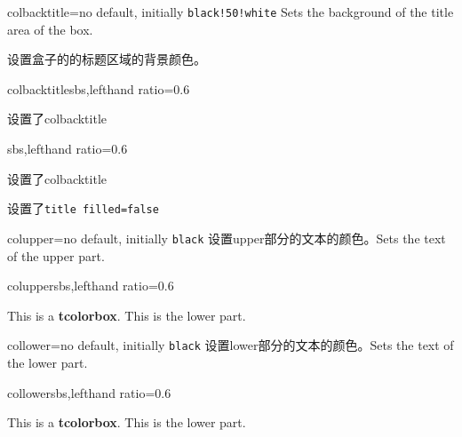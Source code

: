 \begin{docTcbKey}{colbacktitle}{=}{no default, initially \texttt{black!50!white}}
Sets the background  of the title area of the box.

设置盒子的的标题区域的背景颜色。
\begin{exdispExample*}{colbacktitle}{sbs,lefthand ratio=0.6}
\begin{tcolorbox}[colbacktitle=red!50!white,
title=My title,coltitle=black,
fonttitle=\bfseries]
设置了colbacktitle
\end{tcolorbox}
\end{exdispExample*}

\begin{dispExample*}{sbs,lefthand ratio=0.6}
\begin{tcolorbox}[colbacktitle=red!50!white,
title filled=false,
title=My title,coltitle=black,
fonttitle=\bfseries]
设置了colbacktitle

设置了\verb|title filled=false|
\end{tcolorbox}
\end{dispExample*}

\end{docTcbKey}




\begin{docTcbKey}{colupper}{=}{no default, initially \texttt{black}}
设置upper部分的文本的颜色。\hfill Sets the text  of the upper part.
\begin{exdispExample*}{colupper}{sbs,lefthand ratio=0.6}
\begin{tcolorbox}[colupper=red!75!black]
This is a \textbf{tcolorbox}.
\tcblower
This is the lower part.
\end{tcolorbox}
\end{exdispExample*}
\end{docTcbKey}


\begin{docTcbKey}{collower}{=}{no default, initially \texttt{black}}
设置lower部分的文本的颜色。\hfill Sets the text  of the lower part.
\begin{exdispExample*}{collower}{sbs,lefthand ratio=0.6}
\begin{tcolorbox}[collower=red!75!black]
This is a \textbf{tcolorbox}.
\tcblower
This is the lower part.
\end{tcolorbox}
\end{exdispExample*}
\end{docTcbKey}


